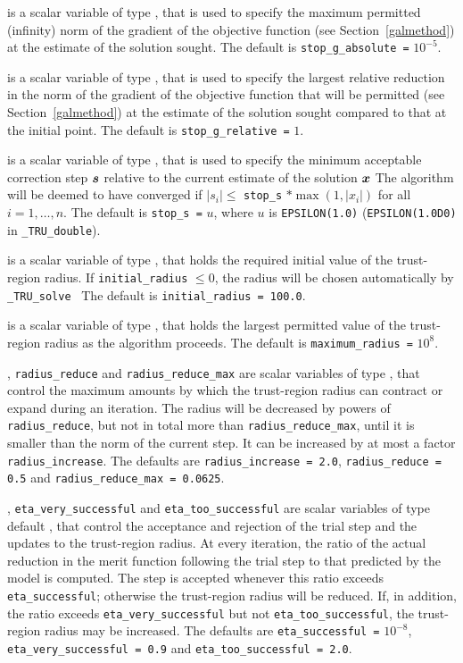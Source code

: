 \documentclass{galahad}
\newcommand{\packagename}{TRU}
\newcommand{\fullpackagename}{\libraryname\_\packagename}
\newcommand{\solver}{{\tt \fullpackagename\_solve}}
\begin{document}
\begin{description}
 is a scalar variable of type \realdp,
that is used to specify the maximum permitted (infinity)
norm of the gradient of the objective function
(see Section~\ref{galmethod}) at the estimate of the solution sought.
The default is {\tt stop\_g\_absolute =} $10^{-5}$.

 is a scalar variable of type \realdp,
that is used to specify the largest relative reduction in the norm of the
gradient of the objective function that will be permitted
(see Section~\ref{galmethod}) at the estimate of the solution sought
compared to that at the initial point.
The default is {\tt stop\_g\_relative =} $1$.

 is a scalar variable of type \realdp,
that is used to specify the minimum acceptable correction step ${\bm{s}}$
relative to the current estimate of the solution ${\bm{x}}$
The algorithm will be deemed to have converged if $|s_i| \leq$
{\tt stop\_s} $\ast \max( 1, |x_i|)$ for all $i = 1, \ldots, n$.
The default is {\tt stop\_s =} $u$,
where $u$ is {\tt EPSILON(1.0)} ({\tt EPSILON(1.0D0)} in
{\tt \fullpackagename\_double}).

 is a scalar variable of type \realdp, that holds
the required initial value of the trust-region radius. If
{\tt initial\_radius} $\leq 0$, the radius will be chosen automatically
by \solver\
The default is {\tt initial\_radius = 100.0}.

 is a scalar variable of type \realdp, that holds
the largest permitted value of the trust-region radius as the algorithm
proceeds.
The default is {\tt maximum\_radius =} $10^8$.

,
{\tt radius\_reduce} and
{\tt radius\_reduce\_max}
are scalar variables of type \realdp, that
control the maximum amounts by which the trust-region radius can
contract or expand during an iteration. The radius will be decreased by
powers of {\tt radius\_reduce}, but not in total
more than  {\tt radius\_reduce\_max}, until it is smaller than the norm of
the current step.
It can be increased by at most a factor {\tt radius\_increase}.
The defaults are
{\tt radius\_increase = 2.0},
{\tt radius\_reduce = 0.5} and
{\tt radius\_reduce\_max = 0.0625}.

, {\tt eta\_very\_successful}
and {\tt eta\_too\_successful}
are scalar variables of type default
\realdp, that control the acceptance and rejection of the trial step
and the updates to the trust-region radius.
At every iteration, the ratio of the actual reduction in the merit function
following the trial step to that predicted by the model is computed.
The step is accepted whenever this ratio exceeds {\tt eta\_successful};
otherwise the trust-region radius will be reduced.
If, in addition, the ratio exceeds {\tt eta\_very\_successful} but not
{\tt eta\_too\_successful}, the trust-region radius may be increased.
The defaults are
{\tt eta\_successful =} $10^{-8}$,
{\tt eta\_very\_successful = 0.9} and
{\tt eta\_too\_successful = 2.0}.


\end{description}
\end{document}
